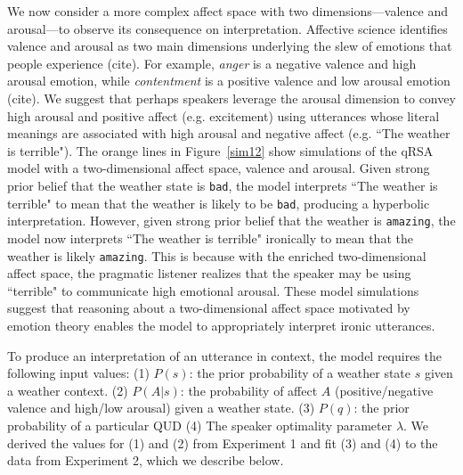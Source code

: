 \documentclass[10pt,letterpaper]{article}
\begin{document}
We now consider a more complex affect space with two dimensions---valence and arousal---to observe its consequence on interpretation. Affective science identifies valence and arousal as two main dimensions underlying the slew of emotions that people experience (cite). For example, \emph{anger} is a negative valence and high arousal emotion, while \emph{contentment} is a positive valence and low arousal emotion (cite). We suggest that perhaps speakers leverage the arousal dimension to convey high arousal and positive affect (e.g. excitement) using utterances whose literal meanings are associated with high arousal and negative affect (e.g. ``The weather is terrible"). The orange lines in Figure~\ref{sim12} show simulations of the qRSA model with a two-dimensional affect space, valence and arousal. Given strong prior belief that the weather state is \texttt{bad}, the model interprets ``The weather is terrible" to mean that the weather is likely to be \texttt{bad}, producing a hyperbolic interpretation. However, given strong prior belief that the weather is \texttt{amazing}, the model now interprets ``The weather is terrible" ironically to mean that the weather is likely \texttt{amazing}. This is because with the enriched two-dimensional affect space, the pragmatic listener realizes that the speaker may be using ``terrible" to communicate high emotional arousal. These model simulations suggest that reasoning about a two-dimensional affect space motivated by emotion theory enables the model to appropriately interpret ironic utterances. 

To produce an interpretation of an utterance in context, the model requires the following input values: (1) $P(s)$: the prior probability of a weather state $s$ given a weather context. (2) $P(A | s)$: the probability of affect $A$ (positive/negative valence and high/low arousal) given a weather state. (3) $P(q)$: the prior probability of a particular QUD (4) The speaker optimality parameter $\lambda$. We derived the values for (1) and (2) from Experiment 1 and fit (3) and (4) to the data from Experiment 2, which we describe below.

\end{document}
